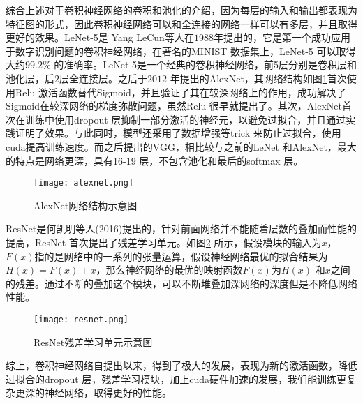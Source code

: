 综合上述对于卷积神经网络的卷积和池化的介绍，因为每层的输入和输出都表现为特征图的形式，因此卷积神经网络可以和全连接的网络一样可以有多层，并且取得更好的效果。LeNet-5\cite{lecun1998gradient-based}是
Yang LeCun等人在$1988$年提出的，它是第一个成功应用于数字识别问题的卷积神经网络，在著名的MINIST 数据集上，LeNet-5 可以取得大约$99.2\%$ 的准确率。LeNet-5是一个经典的卷积神经网络，前5层分别是卷积层和池化层，后2层全连接层。之后于$2012$ 年提出的AlexNet\cite{krizhevsky2012imagenet}，其网络结构如图\ref{fig:alexnet-example}首次使用Relu 激活函数替代Sigmoid，并且验证了其在较深网络上的作用，成功解决了Sigmoid在较深网络的梯度弥散问题，虽然Relu 很早就提出了。其次，AlexNet首次在训练中使用dropout 层抑制一部分激活的神经元，以避免过拟合，并且通过实践证明了效果。与此同时，模型还采用了数据增强等trick 来防止过拟合，使用cuda提高训练速度。而之后提出的VGG\cite{simonyan2015very}，相比较与之前的LeNet 和AlexNet，最大的特点是网络更深，具有16-19 层，不包含池化和最后的softmax 层。
\begin{figure}[htpb]
	\centering
	\texttt{[image: alexnet.png]}
    \caption{AlexNet\cite{krizhevsky2012imagenet}网络结构示意图}
	\vspace*{-3.5mm}
	\label{fig:alexnet-example}
\end{figure}
ResNet\cite{he2016deep}是何凯明等人(2016)提出的，针对前面网络并不能随着层数的叠加而性能的提高，ResNet 首次提出了残差学习单元。如图\ref{fig:resnet-example} 所示，假设模块的输入为$x$，$F(x)$指的是网络中的一系列的张量运算，假设神经网络最优的拟合结果为$H(x) = F(x) + x$，那么神经网络的最优的映射函数$F(x)$为$H(x)$ 和$x$之间的残差。通过不断的叠加这个模块，可以不断堆叠加深网络的深度但是不降低网络性能。
\begin{figure}[htpb]
	\centering
	\texttt{[image: resnet.png]}
    \caption{ResNet残差学习单元示意图}
	\vspace*{-3.5mm}
	\label{fig:resnet-example}
\end{figure}

综上，卷积神经网络自提出以来，得到了极大的发展，表现为新的激活函数，降低过拟合的dropout 层，残差学习模块，加上cuda硬件加速的发展，我们能训练更复杂更深的神经网络，取得更好的性能。

